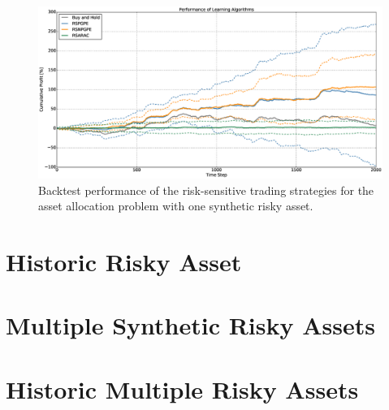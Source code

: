 \begin{figure}[t!]
	\centering
	\includegraphics[width=1.0\textwidth]{Images/6_3_single_synthetic_sensitive_performance}
	\caption[Backtest performance with one synthetic risky asset]{Backtest performance of the risk-sensitive trading strategies for the asset allocation problem with one synthetic risky asset.}
	\label{fig:single_synthetic_sensitive_performance}
\end{figure}

\begin{table}[h!]
\centering
{}
\caption[Risk-sensitive backtest statistics with one synthetic risky asset]{Backtest statistics of the risk-sensitive trading strategies for the asset allocation problem with one synthetic risky asset.}
\label{my-label}
\end{table}



\clearpage
\section{Historic Risky Asset}



\section{Multiple Synthetic Risky Assets}




\section{Historic Multiple Risky Assets}